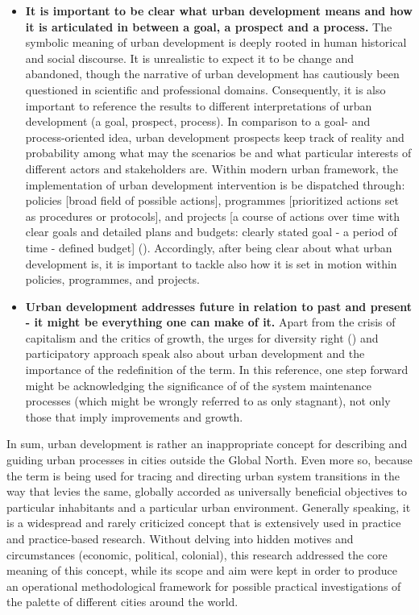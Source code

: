 \documentclass[11pt]{report}
\begin{document}
{{{\begin{itemize}
\item \textbf{It is important to be clear what urban development means and how it is articulated in between a goal, a prospect and a process.}
The symbolic meaning of urban development is deeply rooted in human historical and social discourse. It is unrealistic to expect it to be change and abandoned, though the narrative of urban development has cautiously been questioned in scientific and professional domains. 
Consequently, it is also important to reference the results to different interpretations of urban development (a goal, prospect, process).
In comparison to a goal- and process-oriented idea, urban development prospects keep track of reality and probability among what may the scenarios be and what particular interests of different actors and stakeholders are.
Within modern urban framework, the implementation of urban development intervention is be dispatched through:
policies [broad field of possible actions],
programmes [prioritized actions set as procedures or protocols],
and
projects [a course of actions over time with clear goals and detailed plans and budgets: clearly stated goal - a period of time - defined budget] (\href{Vujosevic}{\citealt{vujosevic_regionalizam_2015}}).
Accordingly, after being clear about what urban development is, it is important to tackle also how it is set in motion within policies, programmes, and projects.

\item \textbf{Urban development addresses future in relation to past and present - it might be everything one can make of it.}
Apart from the crisis of capitalism and the critics of growth, the
urges for diversity right (\href{Amin}{\citealt{amin_good_2006}}) and participatory approach speak also about urban development and the importance of the redefinition of the term. 
In this reference, one step forward might be acknowledging the significance of of the system maintenance processes (which might be wrongly referred to as only stagnant), not only those that imply improvements and growth.
\end{itemize}

In sum, urban development is rather an inappropriate concept for describing and guiding urban processes in cities outside the Global North.
Even more so, because the term is being used for tracing and directing urban system transitions in the way that levies the same, globally accorded as universally beneficial objectives to particular inhabitants and a particular urban environment.
Generally speaking, it is a widespread and rarely criticized concept that is extensively used in practice and practice-based research.
Without delving into hidden motives and circumstances (economic, political, colonial), this research addressed the core meaning of this concept, while its scope and aim were kept in order to produce an operational methodological framework for possible practical investigations of the palette of different cities around the world.

}}}
\end{document}
